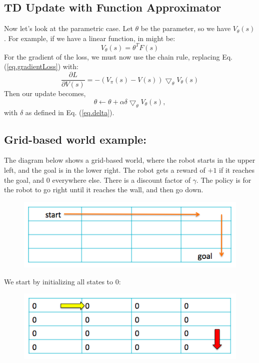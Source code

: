 \documentclass[11pt]{article}
\numberwithin{equation}{section}
\numberwithin{figure}{section}
\begin{document}
\subsection*{TD Update with Function Approximator}
Now let's look at the parametric case.  Let $\theta$ be the parameter, so we have $V_\theta(s)$.  For example, if we have a linear function, in might be:
\begin{equation}
	V_\theta(s) = \theta^TF(s)
\end{equation}
For the gradient of the loss, we must now use the chain rule, replacing Eq. (\ref{eq.gradientLoss}) with:
\begin{equation}
	\frac{\partial L}{\partial V(s)} = -(V_\pi(s) - V(s))\bigtriangledown_\theta V_\theta(s)
\end{equation}
Then our update becomes,
\begin{equation}
	\theta \leftarrow \theta + \alpha \delta \bigtriangledown_\theta V_\theta(s),
\end{equation}
with $\delta$ as defined in Eq. (\ref{eq.delta}).

\subsection*{Grid-based world example:}
The diagram below shows a grid-based world, where the robot starts in the upper left, and the goal is in the lower right.  The robot gets a reward of $+1$ if it reaches the goal, and $0$ everywhere else.  There is a discount factor of $\gamma$.  The policy is for the robot to go right until it reaches the wall, and then go down.
\begin{figure}[h!]
	\centering
	\includegraphics[width=.4\columnwidth]{./images/fig1}
	\label{fig.fig1}
\end{figure}

We start by initializing all states to 0:

\begin{figure}[h!]
	\centering
	\includegraphics[width=.4\columnwidth]{./images/fig2}
	\label{fig.fig2}
\end{figure}
\end{document}
